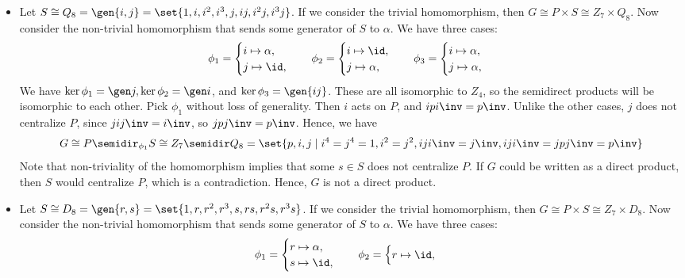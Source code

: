 \begin{solalph}
\begin{itemize}
        \[G \cong P \semidir_\phi S \cong Z_7 \semidir Z_8.\]
        \item Let $S \cong Q_8 = \gen{i, j} = \set{1, i, i^2, i^3, j, ij, i^2j, i^3j}$. If we consider the trivial homomorphism, then $G \cong P \times S \cong Z_7 \times Q_8$. Now consider the non-trivial homomorphism that sends some generator of $S$ to $\alpha$. We have three cases:
        \[\phi_1 = 
        \begin{cases}
            i \mapsto \alpha, \\
            j \mapsto \id,
        \end{cases} \quad
        \phi_2 = 
        \begin{cases}
            i \mapsto \id, \\
            j \mapsto \alpha,
        \end{cases} \quad
        \phi_3 =
        \begin{cases}
            i \mapsto \alpha, \\
            j \mapsto \alpha,
        \end{cases}\]
        We have $\ker\phi_1 = \gen j, \ker\phi_2 = \gen i$, and $\ker\phi_3 = \gen{ij}$. These are all isomorphic to $Z_4$, so the semidirect products will be isomorphic to each other. Pick $\phi_1$ without loss of generality. Then $i$ acts on $P$, and $ipi\inv = p\inv$. Unlike the other cases, $j$ does not centralize $P$, since $jij\inv = i\inv$, so $jpj\inv = p\inv$. Hence, we have
        \[G \cong P \semidir_{\phi_1} S \cong Z_7 \semidir Q_8 = \set{p, i, j \mid i^4 = j^4 = 1, i^2 = j^2, iji\inv = j\inv, iji\inv = jpj\inv = p\inv}\]
        Note that non-triviality of the homomorphism implies that some $s \in S$ does not centralize $P$. If $G$ could be written as a direct product, then $S$ would centralize $P$, which is a contradiction. Hence, $G$ is not a direct product.
        \item Let $S \cong D_8 = \gen{r, s} = \set{1, r, r^2, r^3, s, rs, r^2s, r^3s}$. If we consider the trivial homomorphism, then $G \cong P \times S \cong Z_7 \times D_8$. Now consider the non-trivial homomorphism that sends some generator of $S$ to $\alpha$. We have three cases:
        \[\phi_1 = 
        \begin{cases}
            r \mapsto \alpha, \\
            s \mapsto \id,
        \end{cases} \quad
        \phi_2 =
        \begin{cases}
            r \mapsto \id, \\

\end{cases}\]
\end{itemize}
\end{solalph}
